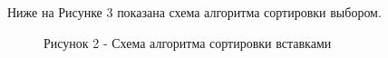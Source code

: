 \documentclass[14pt, a4paper]{extarticle}
\begin{document}
	\clearpage
	Ниже на Рисунке 3 показана схема алгоритма сортировки выбором.
	\begin{figure}[h!]
		\caption*{Рисунок 2 - Схема алгоритма сортировки вставками}
	\end{figure}
	
	
\end{document}
